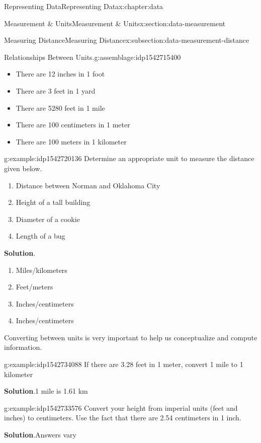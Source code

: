 \documentclass[oneside,10pt,]{book}
\newcommand{\blocktitlefont}{\relax}
\begin{document}
\begin{chapterptx}{Representing Data}{}{Representing Data}{}{}{x:chapter:data}
\begin{sectionptx}{Measurement \& Units}{}{Measurement \& Units}{}{}{x:section:data-measurement}
\begin{subsectionptx}{Measuring Distance}{}{Measuring Distance}{}{}{x:subsection:data-measurement-distance}
\begin{assemblage}{Relationships Between Units.}{g:assemblage:idp1542715400}
%
\begin{itemize}[label=\textbullet]
\item{}There are 12 inches in 1 foot%
\item{}There are 3 feet in 1 yard%
\item{}There are 5280 feet in 1 mile%
\item{}There are 100 centimeters in 1 meter%
\item{}There are 100 meters in 1 kilometer%
\end{itemize}
%
\end{assemblage}
\begin{example}{}{g:example:idp1542720136}%
Determine an appropriate unit to measure the distance given below.%
\par
%
\begin{enumerate}[label=\alph*]
\item{}Distance between Norman and Oklahoma City%
\item{}Height of a tall building%
\item{}Diameter of a cookie%
\item{}Length of a bug%
\end{enumerate}
%
\par\smallskip%
\noindent\textbf{\blocktitlefont Solution}.\hypertarget{g:solution:idp1542724232}{}\quad{}%
\begin{enumerate}[label=\alph*]
\item{}Miles\slash{}kilometers%
\item{}Feet\slash{}meters%
\item{}Inches\slash{}centimeters%
\item{}Inches\slash{}centimeters%
\end{enumerate}
%
\end{example}
Converting between units is very important to help us conceptualize and compute information.%
\begin{example}{}{g:example:idp1542734088}%
If there are 3.28 feet in 1 meter, convert 1 mile to 1 kilometer%
\par\smallskip%
\noindent\textbf{\blocktitlefont Solution}.\hypertarget{g:solution:idp1542729352}{}\quad{}1 mile is 1.61 km%
\end{example}
\begin{example}{}{g:example:idp1542733576}%
Convert your height from imperial units (feet and inches) to centimeters.  Use the fact that there are 2.54 centimeters in 1 inch.%
\par\smallskip%
\noindent\textbf{\blocktitlefont Solution}.\hypertarget{g:solution:idp1542734216}{}\quad{}Answers vary%

\end{example}
\end{subsectionptx}
\end{sectionptx}
\end{chapterptx}
\end{document}
